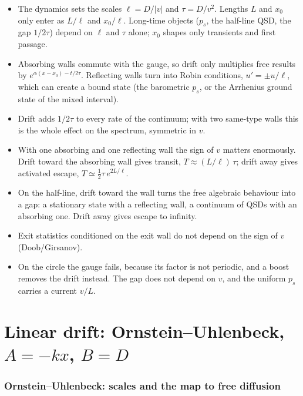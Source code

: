 \documentclass[11pt]{article}
\numberwithin{equation}{section}
\begin{document}
\begin{itemize}
  \item The dynamics sets the scales $\ell=D/|v|$ and $\tau=D/v^2$. Lengths $L$ and $x_0$ only enter as
        $L/\ell$ and $x_0/\ell$. Long-time objects ($p_s$, the half-line QSD, the gap $1/2\tau$) depend on
        $\ell$ and $\tau$ alone; $x_0$ shapes only transients and first passage.
  \item Absorbing walls commute with the gauge, so drift only multiplies free results by
        $e^{\alpha(x-x_0)-t/2\tau}$. Reflecting walls turn into Robin conditions, $u'=\pm u/\ell$, which can
        create a bound state (the barometric $p_s$, or the Arrhenius ground state of the mixed interval).
  \item Drift adds $1/2\tau$ to every rate of the continuum; with two same-type walls this is the whole effect
        on the spectrum, symmetric in $v$.
  \item With one absorbing and one reflecting wall the sign of $v$ matters enormously. Drift toward the
        absorbing wall gives transit, $T\approx(L/\ell)\,\tau$; drift away gives activated escape,
        $T\simeq\tfrac12\tau\,e^{2L/\ell}$.
  \item On the half-line, drift toward the wall turns the free algebraic behaviour into a gap: a stationary
        state with a reflecting wall, a continuum of QSDs with an absorbing one. Drift away gives escape to
        infinity.
  \item Exit statistics conditioned on the exit wall do not depend on the sign of $v$ (Doob/Girsanov).
  \item On the circle the gauge fails, because its factor is not periodic, and a boost removes the drift
        instead. The gap does not depend on $v$, and the uniform $p_s$ carries a current $v/L$.
\end{itemize}


\part{Linear drift: Ornstein--Uhlenbeck, \texorpdfstring{$A=-kx$, $B=D$}{A=-kx, B=D}}
\label{part:ou}

\section{Ornstein--Uhlenbeck: scales and the map to free diffusion}
\label{sec:ou-map}
\end{document}
